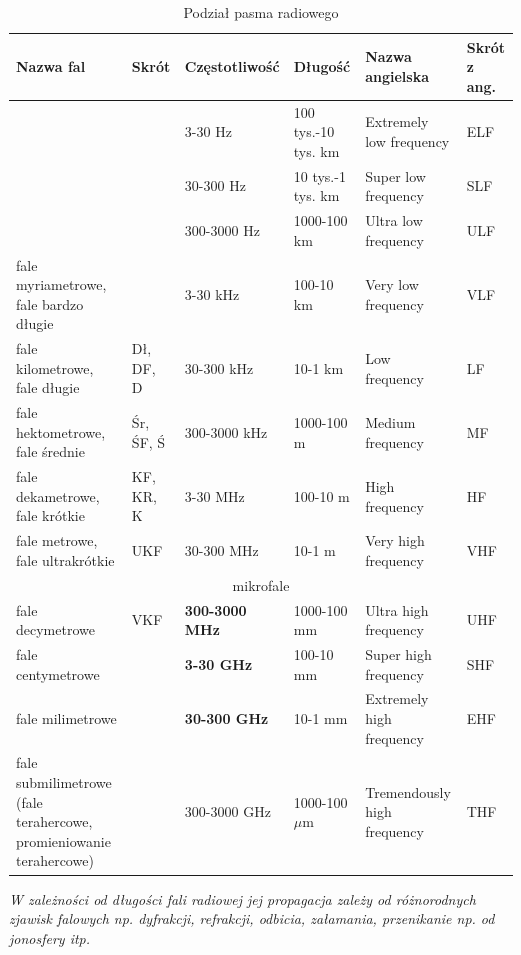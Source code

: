 \begin{table}
\caption{Podział pasma radiowego}
\label{table:radio}
\begin{tabular}{ |p{3cm}|p{1cm}|p{2cm}|p{2cm}|p{2.5cm}|p{1.5cm}|  }
 \hline
Nazwa fal	& Skrót	& Częstotliwość	& Długość	& Nazwa angielska	& Skrót z ang. \\
\hline
\hline
& & 3-30 Hz   & 100 tys.-10 tys. km	& Extremely low frequency	& ELF\\
\hline
& & 30-300 Hz & 10 tys.-1 tys. km	& Super low frequency	    & SLF\\
 \hline
& & 300-3000 Hz & 1000-100 km       & Ultra low frequency	    & ULF\\
 \hline
fale myriametrowe, fale bardzo długie & &	3-30 kHz & 100-10 km & Very low frequency  & VLF\\
\hline
fale kilometrowe, fale długie	& Dł, DF, D & 30-300 kHz & 10-1 km & Low frequency     & LF\\
\hline
fale hektometrowe, fale średnie & Śr, ŚF, Ś & 300-3000 kHz & 1000-100 m  & Medium frequency & MF\\
\hline
fale dekametrowe, fale krótkie  & KF, KR, K	& 3-30 MHz     & 100-10 m    & High frequency           & HF\\
\hline
fale metrowe, fale ultrakrótkie	& UKF	    & 30-300 MHz   & 10-1 m      & Very high frequency      & VHF\\
\hline
\multicolumn{6}{|c|}{mikrofale} \\
\hline
fale decymetrowe	            & VKF       & \textbf{300-3000 MHz} & 1000-100 mm & Ultra high frequency	    & UHF\\
\hline
fale centymetrowe		        &           & \textbf{3-30 GHz}	   & 100-10 mm	 & Super high frequency	    & SHF\\
\hline
fale milimetrowe		        &           & \textbf{30-300 GHz}   & 10-1 mm	 & Extremely high frequency	& EHF\\
\hline
fale submilimetrowe (fale terahercowe, promieniowanie terahercowe) & & 300-3000 GHz & 1000-100 $\mu$m & Tremendously high frequency & THF\\
 \hline
\end{tabular}
\end{table}

\textit{W zależności od długości fali radiowej jej propagacja zależy od różnorodnych zjawisk falowych np. dyfrakcji, refrakcji, odbicia, załamania, przenikanie np. od jonosfery itp.}\cite{FaleRadioweWiki}



